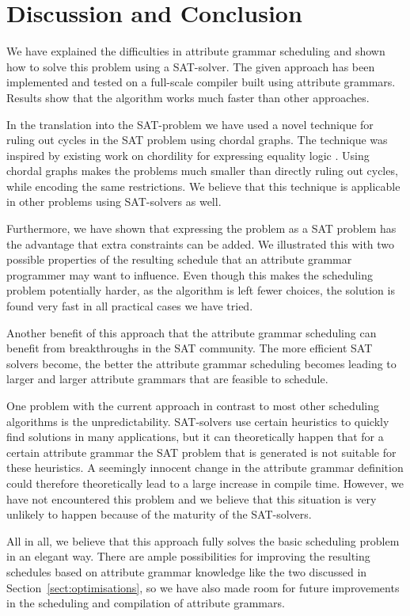 \documentclass{llncs}
\newcommand{\sectref}[1]{Section~\ref{#1}}
\DeclareRobustCommand{\VAN}[3]{#2}
\begin{document}
\section{Discussion and Conclusion} \label{sect:conclusion}
We have explained the difficulties in attribute grammar scheduling and shown how to solve this problem using a SAT-solver. The given approach has been implemented and tested on a full-scale compiler built using attribute grammars. Results show that the algorithm works much faster than other approaches.

In the translation into the SAT-problem we have used a novel technique for ruling out cycles in the SAT problem using chordal graphs. The technique was inspired by existing work on chordility for expressing equality logic \cite{bryant-chordal}. Using chordal graphs makes the problems much smaller than directly ruling out cycles, while encoding the same restrictions. We believe that this technique is applicable in other problems using SAT-solvers as well.

Furthermore, we have shown that expressing the problem as a SAT problem has the advantage that extra constraints can be added. We illustrated this with two possible properties of the resulting schedule that an attribute grammar programmer may want to influence. Even though this makes the scheduling problem potentially harder, as the algorithm is left fewer choices, the solution is found very fast in all practical cases we have tried.

Another benefit of this approach that the attribute grammar scheduling can benefit from breakthroughs in the SAT community. The more efficient SAT solvers become, the better the attribute grammar scheduling becomes leading to larger and larger attribute grammars that are feasible to schedule.

One problem with the current approach in contrast to most other scheduling algorithms is the unpredictability. SAT-solvers use certain heuristics to quickly find solutions in many applications, but it can theoretically happen that for a certain attribute grammar the SAT problem that is generated is not suitable for these heuristics. A seemingly innocent change in the attribute grammar definition could therefore theoretically lead to a large increase in compile time. However, we have not encountered this problem and we believe that this situation is very unlikely to happen because of the maturity of the SAT-solvers.

All in all, we believe that this approach fully solves the basic scheduling problem in an elegant way. There are ample possibilities for improving the resulting schedules based on attribute grammar knowledge like the two discussed in \sectref{sect:optimisations}, so we have also made room for future improvements in the scheduling and compilation of attribute grammars.

\DeclareRobustCommand{\VAN}[3]{#3}


\end{document}
